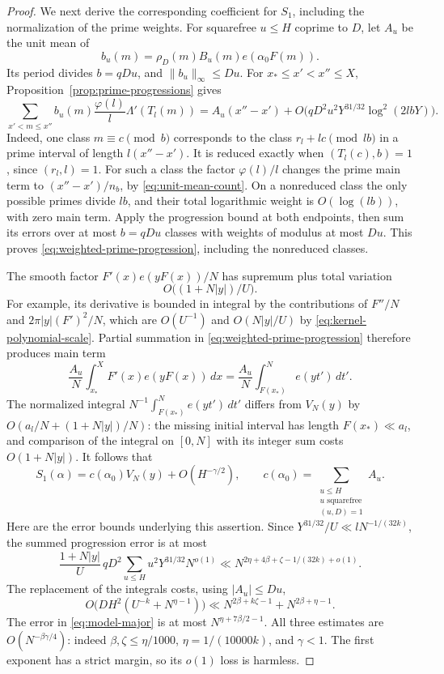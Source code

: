 \begin{proof}
We next derive the corresponding coefficient for $S_1$, including the
normalization of the prime weights.  For squarefree $u\le H$ coprime to
$D$, let $A_u$ be the unit mean of
\[
 b_u(m)=\rho_D(m)B_u(m)e(\alpha_0F(m)).
\]
Its period divides $b=qDu$, and $\|b_u\|_\infty\le Du$.
For $x_*\le x'<x''\le X$, Proposition~\ref{prop:prime-progressions}
gives
\begin{equation}\label{eq:weighted-prime-progression}
 \sum_{x'<m\le x''}b_u(m)\frac{\varphi(l)}l\Lambda'(T_l(m))
 =A_u(x''-x')+
 O\big(qD^2u^2Y^{31/32}\log^2(2lbY)\big).
\end{equation}
Indeed, one class $m\equiv c\pmod b$ corresponds to the class
$r_l+lc\pmod {lb}$ in a prime interval of length $l(x''-x')$.
It is reduced exactly when $(T_l(c),b)=1$, since $(r_l,l)=1$.
For such a class the factor $\varphi(l)/l$ changes the prime main term
to $(x''-x')/n_b$, by \eqref{eq:unit-mean-count}.
On a nonreduced class the only possible primes divide $lb$, and their
total logarithmic weight is $O(\log(lb))$, with zero main term.
Apply the progression bound at both endpoints, then sum its errors over
at most $b=qDu$ classes with weights of modulus at most $Du$.
This proves \eqref{eq:weighted-prime-progression}, including the
nonreduced classes.

The smooth factor $F'(x)e(yF(x))/N$ has supremum plus total variation
\[
 O\big((1+N|y|)/U\big).
\]
For example, its derivative is bounded in integral by the contributions
of $F''/N$ and $2\pi |y|(F')^2/N$, which are $O(U^{-1})$ and
$O(N|y|/U)$ by \eqref{eq:kernel-polynomial-scale}.
Partial summation in \eqref{eq:weighted-prime-progression} therefore
produces main term
\[
 \frac{A_u}{N}\int_{x_*}^{X}F'(x)e(yF(x))\,dx
 =\frac{A_u}{N}\int_{F(x_*)}^{N}e(yt')\,dt'.
\]
The normalized integral $N^{-1}\int_{F(x_*)}^{N}e(yt')\,dt'$ differs
from $V_N(y)$ by
$O(a_l/N+(1+N|y|)/N)$: the missing initial interval has length
$F(x_*)\ll a_l$, and comparison of the integral on $[0,N]$ with its
integer sum costs $O(1+N|y|)$.
It follows that
\begin{equation}\label{eq:prime-major}
 S_1(\alpha)=c(\alpha_0)V_N(y)+O(H^{-\gamma/2}),\qquad
 c(\alpha_0)=
 \sum_{\substack{u\le H\\u\text{ squarefree}\\(u,D)=1}}A_u.
\end{equation}
Here are the error bounds underlying this assertion.  Since
$Y^{31/32}/U\ll lN^{-1/(32k)}$, the summed progression error is at most
\[
 \frac{1+N|y|}{U}\,qD^2
 \sum_{u\le H}u^2Y^{31/32}N^{o(1)}
 \ll N^{2\eta+4\beta+\zeta-1/(32k)+o(1)}.
\]
The replacement of the integrals costs, using $|A_u|\le Du$,
\[
 O\big(DH^2(U^{-k}+N^{\eta-1})\big)
 \ll N^{2\beta+k\zeta-1}+N^{2\beta+\eta-1}.
\]
The error in \eqref{eq:model-major} is at most
$N^{\eta+7\beta/2-1}$.  All three estimates are
$O(N^{-\beta\gamma/4})$: indeed $\beta,\zeta\le\eta/1000$,
$\eta=1/(10000k)$, and $\gamma<1$.  The first exponent has a strict
margin, so its $o(1)$ loss is harmless.


\end{proof}
